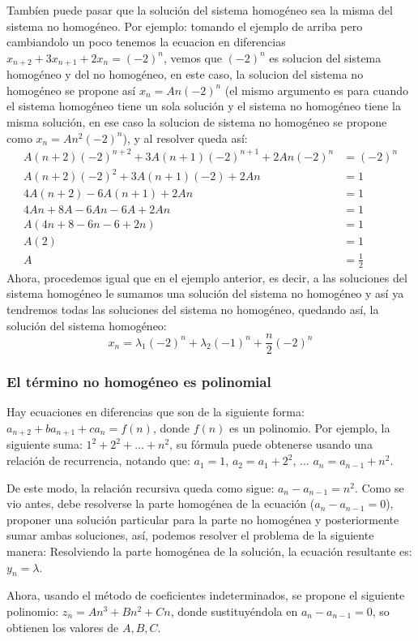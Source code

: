 \documentclass{article}
\begin{document}
Tambíen puede pasar que la soluci\'on del sistema homogéneo sea la misma del sistema no homogéneo. Por ejemplo: tomando el ejemplo de arriba pero cambiandolo un poco tenemos la ecuacion en diferencias $x_{n+2}+3x_{n+1}+2x_n=(-2)^n$, vemos que $(-2)^n$ es solucion del sistema homogéneo y del no homogéneo, en este caso, la solucion del sistema no homogéneo se propone así $x_n=An(-2)^n$ (el mismo argumento es para cuando el sistema homogéneo tiene un sola solución y el sistema no homogéneo tiene la misma solución, en ese caso la solucion de sistema no homogéneo se propone como $x_n=An^2(-2)^n$), y al resolver queda así:
\begin{align*}
  A(n+2)(-2)^{n+2}+3A(n+1)(-2)^{n+1}+2An(-2)^n&=(-2)^n\\
  A(n+2)(-2)^2+3A(n+1)(-2)+2An&=1\\
  4A(n+2)-6A(n+1)+2An&=1\\
  4An+8A-6An-6A+2An&=1\\
  A(4n+8-6n-6+2n)&=1\\
  A(2)&=1\\
  A&=\frac{1}{2}
\end{align*}
Ahora, procedemos igual que en el ejemplo anterior, es decir, a las soluciones del sistema homogéneo le sumamos una solución del sistema no homogéneo y así ya tendremos todas las soluciones del sistema no homogéneo, quedando así, la solución del sistema homogéneo:
$$x_n=\lambda_1(-2)^n+\lambda_2(-1)^n+\frac{n}{2}(-2)^n$$
\subsubsection{El término no homogéneo es polinomial}
\label{sec:polinomial}

Hay ecuaciones en diferencias que son de la siguiente forma: $a_{n+2}+ba_{n+1}+ca_n=f(n)$, donde $f(n)$ es un polinomio. Por ejemplo, la siguiente suma: $1^2+2^2+...+n^2$, su fórmula puede obtenerse usando una relación de recurrencia, notando que:
$a_1=1$,
$a_2=a_1+2^2$,
...
$a_n=a_{n-1}+n^2$.


De este modo, la relación recursiva queda como sigue: $a_{n}-a_{n-1}=n^2$.
Como se vio antes, debe resolverse la parte homogénea de la ecuación ($a_n-a_{n-1}=0$), proponer una solución particular para la parte no homogénea y posteriormente sumar ambas soluciones, así, podemos resolver el problema de la siguiente manera:
Resolviendo la parte homogénea de la solución, la ecuación resultante es: $y_n=\lambda$.

Ahora, usando el método de coeficientes indeterminados, se propone el siguiente polinomio: $z_n=An^3+Bn^2+Cn$, donde sustituyéndola en $a_n-a_{n-1}=0$, so obtienen los valores de $A,B,C$.
\end{document}
